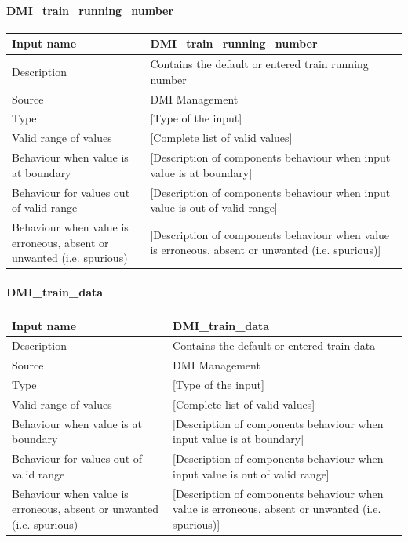 \paragraph{DMI\_train\_running\_number}

\begin{longtable}{p{}p{}}
\toprule
Input name				& DMI\_train\_running\_number \\
\midrule
Description				& Contains the default or entered train running number \\
\midrule
Source					& DMI Management \\ 
\midrule
Type					& [Type of the input] \\
\midrule
Valid range of values	& [Complete list of valid values] \\
\midrule
Behaviour when value is at boundary	& [Description of components behaviour when input value is at boundary] \\
\midrule
Behaviour for values out of valid range	& [Description of components behaviour when input value is out of valid range] \\
\midrule
Behaviour when value is erroneous, absent or unwanted (i.e. spurious) & [Description of components behaviour when value is erroneous, absent or unwanted (i.e. spurious)] \\
\bottomrule
\end{longtable}

\paragraph{DMI\_train\_data}

\begin{longtable}{p{}p{}}
\toprule
Input name				& DMI\_train\_data \\
\midrule
Description				& Contains the default or entered train data \\
\midrule
Source					& DMI Management \\ 
\midrule
Type					& [Type of the input] \\
\midrule
Valid range of values	& [Complete list of valid values] \\
\midrule
Behaviour when value is at boundary	& [Description of components behaviour when input value is at boundary] \\
\midrule
Behaviour for values out of valid range	& [Description of components behaviour when input value is out of valid range] \\
\midrule
Behaviour when value is erroneous, absent or unwanted (i.e. spurious) & [Description of components behaviour when value is erroneous, absent or unwanted (i.e. spurious)] \\
\bottomrule
\end{longtable}

